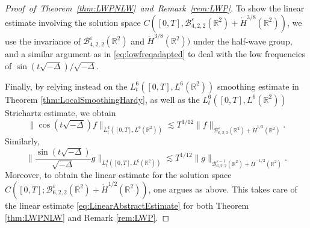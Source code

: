 \documentclass{amsart}
\theoremstyle{definition}
\newcommand{\R}{\mathbb{R}}
\newcommand {\Rtwo}{\mathbb{R}^{2}}
\newcommand {\Ba}{\mathcal{B}}
\newcommand {\veps}{\varepsilon}
\numberwithin{equation}{section}
\begin{document}
\begin{proof}[Proof~of~Theorem~\ref{thm:LWPNLW}~and~Remark~\ref{rem:LWP}]
To show the linear estimate involving the solution space $C([0,T],\Ba^{\veps}_{4,2,2}(\Rtwo)+\dot{H}^{3/8}(\Rtwo))$, we use the invariance of $\Ba^{\veps}_{4,2,2}(\Rtwo)$ and $\dot{H}^{3/8}(\Rtwo))$ under the half-wave group, and a similar argument as in \eqref{eq:lowfreqadapted} to deal with the low frequencies of $\sin(t\sqrt{-\Delta})/\sqrt{-\Delta}$.

Finally, by relying instead on the $L^{6}_{t}([0,T],L^{6}(\Rtwo))$ smoothing estimate in Theorem \ref{thm:LocalSmoothingHardy}, as well as the $L_t^6([0,T], L^6(\R^2))$ Strichartz estimate, we obtain
\begin{equation*}
\| \cos(t \sqrt{-\Delta}) f \|_{L_t^4([0,T],L^6(\R^2))} \lesssim T^{1/12} \| f \|_{\mathcal{B}^\varepsilon_{6,2,2}(\R^2) + \dot{H}^{1/2}(\R^2)}.
\end{equation*}
Similarly,
\begin{equation*}
\Big\| \frac{\sin(t \sqrt{-\Delta})}{\sqrt{-\Delta}} g \Big\|_{L_t^4([0,T], L^6(\R^{2}))} \lesssim T^{1/12} \| g \|_{\mathcal{B}^{\varepsilon-1}_{6,2,2}(\R^2) + \dot{H}^{-1/2}(\R^2)}.
\end{equation*}
Moreover, to obtain the linear estimate for the solution space $C([0,T];\Ba^{\veps}_{6,2,2}(\Rtwo)+\dot{H}^{1/2}(\Rtwo))$, one argues as above. This takes care of the linear estimate \eqref{eq:LinearAbstractEstimate} for both Theorem \ref{thm:LWPNLW} and Remark \ref{rem:LWP}.


\end{proof}
\end{document}
